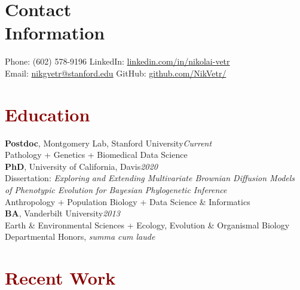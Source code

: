 \documentclass[11pt,margin,line]{resume}
\begin{document}
\name{\huge \textcolor{DarkRed}{Nikolai G. Vetr}}
\begin{resume}
\vspace{-5mm}
\section{\mysidestyle Contact\\Information}
    Phone: (602) 578-9196       \hfill LinkedIn: \href{https://www.linkedin.com/in/nikolai-vetr}{linkedin.com/in/nikolai-vetr} \\
\noindent Email: \href{mailto:nikgvetr@stanford.edu}{nikgvetr@stanford.edu}  \hfill GitHub: \href{https://www.github.com/NikVetr/}{github.com/NikVetr/} \vspace{0mm}\\\vspace{-6.5mm}

\section{\large\textcolor{DarkRed}{Education}}

\textbf{Postdoc}, Montgomery Lab, Stanford University\hfill\emph{Current}\\
Pathology + Genetics + Biomedical Data Science
\vspace{-1em}\\

\textbf{PhD}, University of California, Davis\hfill\emph{2020}\\
Dissertation: \textit{Exploring and Extending Multivariate Brownian Diffusion Models\\\hspace*{22mm} of Phenotypic Evolution for Bayesian Phylogenetic Inference}\\
Anthropology + Population Biology + Data Science \& Informatics
\vspace{-1em}\\

\textbf{BA}, Vanderbilt University\hfill\emph{2013}\\
Earth \& Environmental Sciences + Ecology, Evolution \& Organismal Biology\\
Departmental Honors, \textit{summa cum laude}\\
\vspace{-1.5em}

\section{\large\textcolor{DarkRed}{Recent Work}}


\end{resume}
\end{document}
